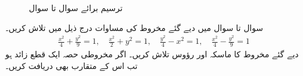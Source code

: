 \begin{figure}
\begin{subfigure}{0.22\textwidth}
\caption{}
\end{subfigure}
\caption{ترسیم برائے سوال  تا سوال }
\label{شکل_مخروط_ترخیم_بائیں_دائیں}
\end{figure}

سوال  تا سوال  میں دیے گئے مخروط کی مساوات درج ذیل میں تلاش کریں۔
\begin{align*}
\frac{x^2}{4}+\frac{y^2}{9}=1,\quad \frac{x^2}{2}+y^2=1,\quad \frac{y^2}{4}-x^2=1,\quad \frac{x^2}{4}-\frac{y^2}{9}=1
\end{align*}
دیے گئے مخروط کا ماسکہ اور رؤوس  تلاش کریں۔ اگر مخروطی حصہ ایک  قطع زائد  ہو تب اس کے متقارب بھی دریافت کریں۔

